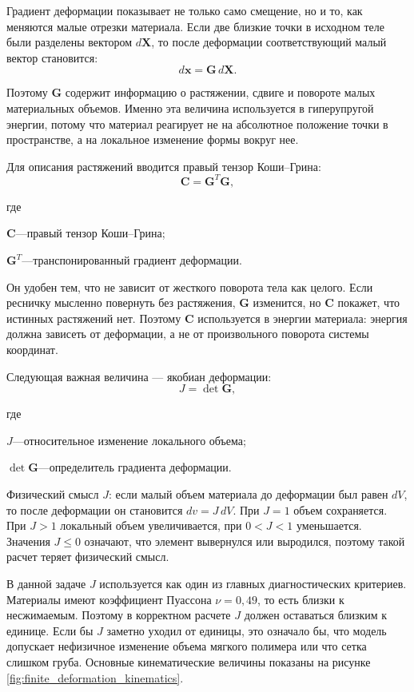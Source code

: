 \documentclass[14pt,a4paper]{extarticle}
\newif\ifwherefirst
\newcommand{\whereitem}[2]{%
    \ifwherefirst
        \wherefirstfalse
        #1\hspace{0.25em}---\hspace{0.25em}#2\par
    \else
        \noindent\hspace*{\parindent}\hphantom{где\enspace}#1\hspace{0.25em}---\hspace{0.25em}#2\par
    \fi
}
\newenvironment{whereblock}{%
    \vspace*{-1.55\baselineskip}%
    \begingroup
    \singlespacing
    \wherefirsttrue
    \par\indent где\enspace\ignorespaces
}{%
    \par\endgroup
    \par\vspace{\baselineskip}
}
\begin{document}
Градиент деформации показывает не только само смещение, но и то, как меняются малые отрезки материала. Если две близкие точки в исходном теле были разделены вектором \(d\mathbf{X}\), то после деформации соответствующий малый вектор становится:
\begin{equation}
    d\mathbf{x}=\mathbf{G}\,d\mathbf{X}.
\end{equation}

Поэтому \(\mathbf{G}\) содержит информацию о растяжении, сдвиге и повороте малых материальных объемов. Именно эта величина используется в гиперупругой энергии, потому что материал реагирует не на абсолютное положение точки в пространстве, а на локальное изменение формы вокруг нее.

Для описания растяжений вводится правый тензор Коши--Грина:
\begin{equation}
    \mathbf{C}=\mathbf{G}^{T}\mathbf{G},
\end{equation}
\begin{whereblock}
\whereitem{\(\mathbf{C}\)}{правый тензор Коши--Грина;}
\whereitem{\(\mathbf{G}^{T}\)}{транспонированный градиент деформации.}
\end{whereblock}

Он удобен тем, что не зависит от жесткого поворота тела как целого. Если ресничку мысленно повернуть без растяжения, \(\mathbf{G}\) изменится, но \(\mathbf{C}\) покажет, что истинных растяжений нет. Поэтому \(\mathbf{C}\) используется в энергии материала: энергия должна зависеть от деформации, а не от произвольного поворота системы координат.

Следующая важная величина --- якобиан деформации:
\begin{equation}
    J=\det\mathbf{G},
\end{equation}
\begin{whereblock}
\whereitem{\(J\)}{относительное изменение локального объема;}
\whereitem{\(\det\mathbf{G}\)}{определитель градиента деформации.}
\end{whereblock}

Физический смысл \(J\): если малый объем материала до деформации был равен \(dV\), то после деформации он становится \(dv=J\,dV\). При \(J=1\) объем сохраняется. При \(J>1\) локальный объем увеличивается, при \(0<J<1\) уменьшается. Значения \(J\le0\) означают, что элемент вывернулся или выродился, поэтому такой расчет теряет физический смысл.

В данной задаче \(J\) используется как один из главных диагностических критериев. Материалы имеют коэффициент Пуассона \(\nu=0,49\), то есть близки к несжимаемым. Поэтому в корректном расчете \(J\) должен оставаться близким к единице. Если бы \(J\) заметно уходил от единицы, это означало бы, что модель допускает нефизичное изменение объема мягкого полимера или что сетка слишком груба. Основные кинематические величины показаны на рисунке \ref{fig:finite_deformation_kinematics}.
\end{document}
